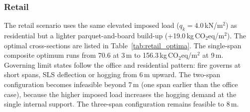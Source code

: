 \subsubsection{Retail}
\label{sec:res_retail}
The retail scenario uses the same elevated imposed load ($q_k = 4.0$\,kN/m$^2$) as residential but a lighter parquet-and-board build-up (+19.0\,kg\,CO$_2$eq/m$^2$). The optimal cross-sections are listed in Table~\ref{tab:retail_optima}. The single-span composite optimum runs from 70.6 at 3\,m to 156.3\,kg\,CO$_2$eq/m$^2$ at 9\,m. Governing limit states follow the office and residential pattern: fire governs at short spans, SLS deflection or hogging from 6\,m upward. The two-span configuration becomes infeasible beyond 7\,m (one span earlier than the office case), because the higher imposed load increases the hogging demand at the single internal support. The three-span configuration remains feasible to 8\,m.

